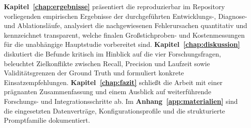 \textbf{Kapitel~\ref{chap:ergebnisse}} präsentiert die reproduzierbar im Repository vorliegenden empirischen Ergebnisse der durchgeführten Entwicklungs-, Diagnose- und Ablationsläufe, analysiert die nachgewiesenen Fehlerursachen quantitativ und kennzeichnet transparent, welche finalen Großstichproben- und Kostenmessungen für die unabhängige Hauptstudie vorbereitet sind. \textbf{Kapitel~\ref{chap:diskussion}} diskutiert die Befunde kritisch im Hinblick auf die vier Forschungsfragen, beleuchtet Zielkonflikte zwischen Recall, Precision und Laufzeit sowie Validitätsgrenzen der Ground Truth und formuliert konkrete Einsatzempfehlungen. \textbf{Kapitel~\ref{chap:fazit}} schließt die Arbeit mit einer prägnanten Zusammenfassung und einem Ausblick auf weiterführende Forschungs- und Integrationsschritte ab. Im \textbf{Anhang~\ref{app:materialien}} sind die eingesetzten Datenverträge, Konfigurationsprofile und die strukturierte Promptfamilie dokumentiert.
